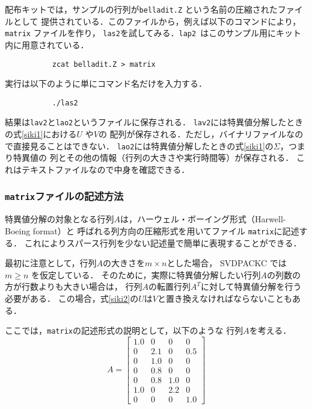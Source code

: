 配布キットでは，サンプルの行列が{\tt belladit.Z} という名前の圧縮されたファイルとして
提供されている．このファイルから，例えば以下のコマンドにより，{\tt matrix} ファイルを作り，
{\tt las2}を試してみる．{\tt lap2 }はこのサンプル用にキット内に用意されている．
\begin{verbatim}
           zcat belladit.Z > matrix
\end{verbatim}
\noindent
実行は以下のように単にコマンド名だけを入力する．
\begin{verbatim}
           ./las2
\end{verbatim}
\noindent
結果は{\tt lav2}と{\tt lao2}というファイルに保存される．
{\tt lav2}には特異値分解したときの\mbox{式\ref{siki1}}における\( U \) や\( V \)の
配列が保存される．ただし，バイナリファイルなので直接見ることはできない．
{\tt lao2}には特異値分解したときの\mbox{式\ref{siki1}}の\( \Sigma \)，つまり特異値の
列とその他の情報（行列の大きさや実行時間等）が保存される．
これはテキストファイルなので中身を確認できる．

\subsubsection{{\tt matrix}ファイルの記述方法}

特異値分解の対象となる行列\( A \)は，ハーウェル・ボーイング形式（Harwell-Boeing format）と
呼ばれる列方向の圧縮形式を用いてファイル {\tt matrix}に記述する．
これによりスパース行列を少ない記述量で簡単に表現することができる．

最初に注意として，行列\( A \)の大きさを\( m \times n \)とした場合，
SVDPACKC では \( m \ge n \) を仮定している．
そのために，実際に特異値分解したい行列\( A \)の列数の方が行数よりも大きい場合は，
行列\( A \)の転置行列\( A^{T} \)に対して特異値分解を行う必要がある．
この場合，\mbox{式\ref{siki2}}の\( U \)は\( V \)と置き換えなければならないこともある．

ここでは，{\tt matrix}の記述形式の説明として，以下のような
行列\( A \)を考える．
\[
A = \left[
      \begin{array}{cccc}
         1.0 & 0   & 0   & 0      \\
         0   & 2.1 & 0   & 0.5    \\
         0   & 1.0 & 0   & 0      \\
         0   & 0.8 & 0   & 0      \\
         0   & 0.8 & 1.0 & 0      \\
         1.0 & 0   & 2.2 & 0    \\
         0   & 0   & 0   & 1.0     
      \end{array}
    \right]
\]

